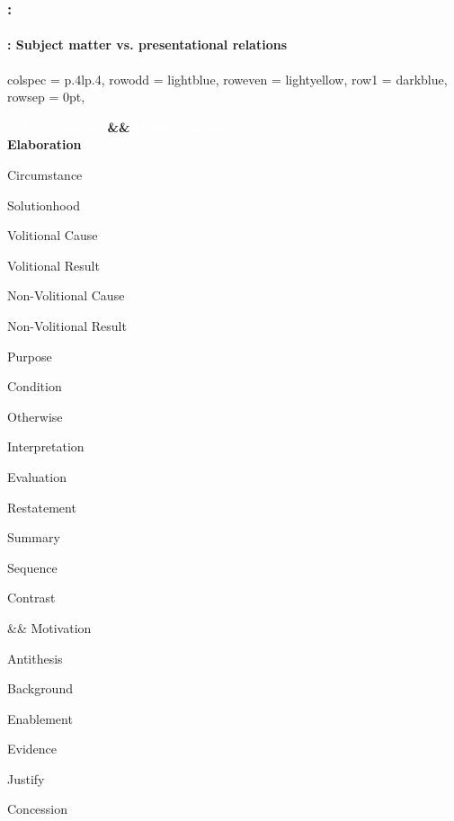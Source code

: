 \documentclass[xcolor=table]{beamer}
\begin{document}
\begin{frame}
	\frametitle{\insertshortsubtitle: \insertsection}
	\framesubtitle{\insertsubsection: Subject matter vs. presentational relations}
	
	\begin{center}
		\footnotesize
	\begin{tblr}{
			colspec = {p{.4\textwidth}lp{.4\textwidth}},
			row{odd} = {lightblue},
			row{even} = {lightyellow},
			row{1} = {darkblue},
			rowsep = 0pt,
		}

		\bfseries\textcolor{white}{Subject matter} && \bfseries\textcolor{white}{Presentational}\\
		
		Elaboration
		
		Circumstance
		
		Solutionhood
		
		Volitional Cause
		
		Volitional Result
		
		Non-Volitional Cause
		
		Non-Volitional Result
		
		Purpose
		
		Condition
		
		Otherwise
		
		Interpretation
		
		Evaluation
		
		Restatement
		
		Summary
		
		Sequence
		
		Contrast
		
		&&
		Motivation
		
		Antithesis
		
		Background
		
		Enablement
		
		Evidence
		
		Justify
		
		Concession\\
	\end{tblr}
	\end{center}
	
\end{frame}
\end{document}

